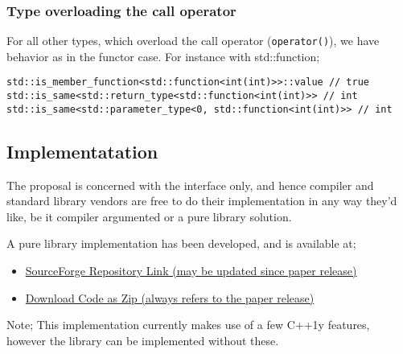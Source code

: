 \subsubsection{Type overloading the call operator}
For all other types, which overload the call operator (\verb|operator()|), we have
behavior as in the functor case. For instance with std::function;
\begin{verbatim}
std::is_member_function<std::function<int(int)>>::value // true
std::is_same<std::return_type<std::function<int(int)>> // int
std::is_same<std::parameter_type<0, std::function<int(int)>> // int
\end{verbatim}

\subsection{Implementatation}
The proposal is concerned with the interface only, and hence compiler and
standard library vendors are free to do their implementation in any way they'd
like, be it compiler argumented or a pure library solution.

A pure library implementation has been developed, and is available at;
\begin{itemize}
\item \href{https://sourceforge.net/p/calltraits/code/ci/default/tree/code/combined/}
    {SourceForge Repository Link (may be updated since paper release)}
\item \href{http://sourceforge.net/code-snapshots/hg/c/ca/calltraits/code/calltraits-code-b1755248eaf854ea9cd0ef054cfb157de1b09daf.zip}
    {Download Code as Zip (always refers to the paper release)}
\end{itemize}
Note; This implementation currently makes use of a few C++1y features, however
the library can be implemented without these.
